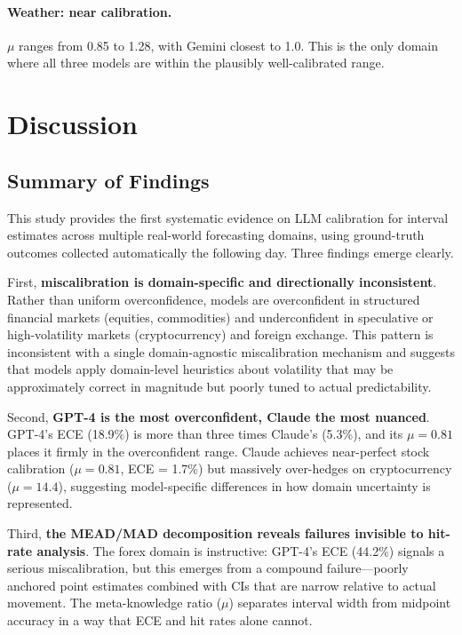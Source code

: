 \documentclass[9pt,twoside,lineno]{pnas-new}
\begin{document}
\paragraph{Weather: near calibration.} $\mu$ ranges from 0.85 to 1.28, with Gemini closest to 1.0. This is the only domain where all three models are within the plausibly well-calibrated range.

\section*{Discussion}

\subsection*{Summary of Findings}

This study provides the first systematic evidence on LLM calibration for interval estimates across multiple real-world forecasting domains, using ground-truth outcomes collected automatically the following day. Three findings emerge clearly.

First, \textbf{miscalibration is domain-specific and directionally inconsistent}. Rather than uniform overconfidence, models are overconfident in structured financial markets (equities, commodities) and underconfident in speculative or high-volatility markets (cryptocurrency) and foreign exchange. This pattern is inconsistent with a single domain-agnostic miscalibration mechanism and suggests that models apply domain-level heuristics about volatility that may be approximately correct in magnitude but poorly tuned to actual predictability.

Second, \textbf{GPT-4 is the most overconfident, Claude the most nuanced}. GPT-4's ECE (18.9\%) is more than three times Claude's (5.3\%), and its $\mu = 0.81$ places it firmly in the overconfident range. Claude achieves near-perfect stock calibration ($\mu = 0.81$, ECE = 1.7\%) but massively over-hedges on cryptocurrency ($\mu = 14.4$), suggesting model-specific differences in how domain uncertainty is represented.

Third, \textbf{the MEAD/MAD decomposition reveals failures invisible to hit-rate analysis}. The forex domain is instructive: GPT-4's ECE (44.2\%) signals a serious miscalibration, but this emerges from a compound failure---poorly anchored point estimates combined with CIs that are narrow relative to actual movement. The meta-knowledge ratio ($\mu$) separates interval width from midpoint accuracy in a way that ECE and hit rates alone cannot.
\end{document}
